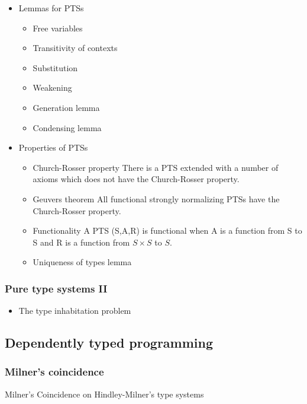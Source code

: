 \documentclass[11pt]{article}
\begin{document}
\begin{itemize}
\item Lemmas for PTSs
\label{sec-9-1-4-5}
\begin{itemize}
\item Free variables
\label{sec-9-1-4-5-1}
\item Transitivity of contexts
\label{sec-9-1-4-5-2}
\item Substitution
\label{sec-9-1-4-5-3}
\item Weakening
\label{sec-9-1-4-5-4}
\item Generation lemma
\label{sec-9-1-4-5-5}
\item Condensing lemma
\label{sec-9-1-4-5-6}
\end{itemize}
\item Properties of PTSs
\label{sec-9-1-4-6}
\begin{itemize}
\item Church-Rosser property
\label{sec-9-1-4-6-1}
There is a PTS extended with a number of axioms which does not have
the Church-Rosser property.

\item Geuvers theorem
\label{sec-9-1-4-6-2}
All functional strongly normalizing PTSs have the Church-Rosser
property.

\item Functionality
\label{sec-9-1-4-6-3}
A PTS (S,A,R) is functional when A is a function from S to S and
R is a function from $S \times S$ to $S$.

\item Uniqueness of types lemma
\label{sec-9-1-4-6-4}
\end{itemize}
\end{itemize}
\subsubsection*{Pure type systems II}
\label{sec-9-1-5}
\begin{itemize}
\item The type inhabitation problem
\label{sec-9-1-5-1}
\end{itemize}
\subsection*{Dependently typed programming}
\label{sec-9-2}
\subsubsection*{Milner's coincidence}
\label{sec-9-2-1}
Milner's Coincidence on Hindley-Milner's type systems
\end{document}
